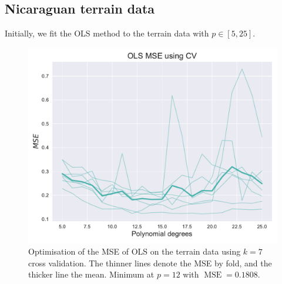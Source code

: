 \documentclass[twocolumn,english,notitlepage]{article}
\DeclareMathOperator{\mse}{MSE}
\begin{document}
    \subsection{Nicaraguan terrain data}
    Initially, we fit the OLS method to the terrain data with $p\in[5, 25]$. 
        \begin{figure} [ht]
            \centering
            \includegraphics[width=\linewidth]{OPT_OLS_mse_kfold.pdf}
            \caption{Optimisation of the MSE of OLS on the terrain data using $k=7$ cross validation. The thinner lines denote the MSE by fold, and the thicker line the mean. Minimum at $p=12$ with $\mse = 0.1808$.}
            \label{res:fig:Nica_OLS}
        \end{figure}
    
\end{document}
